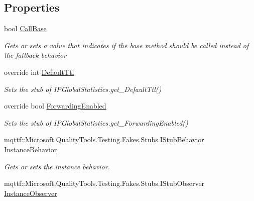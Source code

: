 \subsection*{Properties}
\begin{DoxyCompactItemize}
\item 
bool \hyperlink{class_system_1_1_net_1_1_network_information_1_1_fakes_1_1_stub_i_p_global_statistics_ad664a826b8e457bdd702e6856add0b43}{Call\-Base}
\begin{DoxyCompactList}\small\item\em Gets or sets a value that indicates if the base method should be called instead of the fallback behavior\end{DoxyCompactList}\item 
override int \hyperlink{class_system_1_1_net_1_1_network_information_1_1_fakes_1_1_stub_i_p_global_statistics_a2cc1692a90f3816767e34f6c8d7e133b}{Default\-Ttl}
\begin{DoxyCompactList}\small\item\em Sets the stub of I\-P\-Global\-Statistics.\-get\-\_\-\-Default\-Ttl()\end{DoxyCompactList}\item 
override bool \hyperlink{class_system_1_1_net_1_1_network_information_1_1_fakes_1_1_stub_i_p_global_statistics_a2d0a8eb34249e1177746d3b7f3d451a9}{Forwarding\-Enabled}
\begin{DoxyCompactList}\small\item\em Sets the stub of I\-P\-Global\-Statistics.\-get\-\_\-\-Forwarding\-Enabled()\end{DoxyCompactList}\item 
mqttf\-::\-Microsoft.\-Quality\-Tools.\-Testing.\-Fakes.\-Stubs.\-I\-Stub\-Behavior \hyperlink{class_system_1_1_net_1_1_network_information_1_1_fakes_1_1_stub_i_p_global_statistics_a47c5c53b50e89be1ef198d5a87aa58b2}{Instance\-Behavior}
\begin{DoxyCompactList}\small\item\em Gets or sets the instance behavior.\end{DoxyCompactList}\item 
mqttf\-::\-Microsoft.\-Quality\-Tools.\-Testing.\-Fakes.\-Stubs.\-I\-Stub\-Observer \hyperlink{class_system_1_1_net_1_1_network_information_1_1_fakes_1_1_stub_i_p_global_statistics_ae93953d5a561b619c35a166df9124cdd}{Instance\-Observer}

\end{DoxyCompactItemize}
